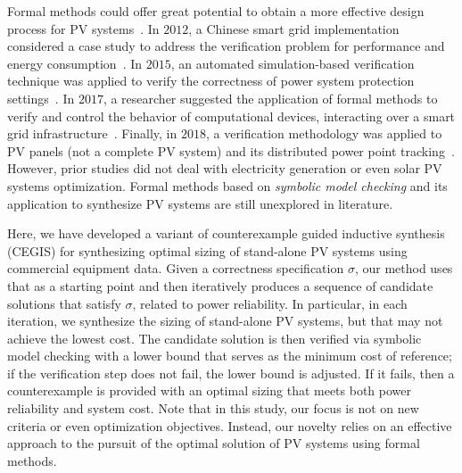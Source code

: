 \documentclass[journal]{IEEEtran}
\begin{document}
Formal methods could offer great potential to obtain a more effective design process for PV systems~\cite{ClarkeHV18}. In $2012$, a Chinese smart grid implementation considered a case study to address the verification problem for performance and energy consumption~\cite{Yukseletall2012}. In $2015$, an automated simulation-based verification technique was applied to verify the correctness of power system protection settings~\cite{Sengupta2015}. In $2017$, a researcher suggested the application of formal methods to verify and control the behavior of computational devices, interacting over a smart grid infrastructure~\cite{Abate2017}. Finally, in $2018$, a verification methodology was applied to PV panels (not a complete PV system) and its distributed power point tracking~\cite{Driouich2018}. However, prior studies did not deal with electricity generation or even solar PV systems optimization. Formal methods based on \textit{symbolic model checking} and its application to synthesize PV systems are still unexplored in literature.
 
Here, we have developed a variant of counterexample guided inductive synthesis (CEGIS) for synthesizing optimal sizing of stand-alone PV systems using commercial equipment data. Given a correctness specification $\sigma$, our method uses that as a starting point and then iteratively produces a sequence of candidate solutions that satisfy $\sigma$, related to power reliability. In particular, in each iteration, we synthesize the sizing of stand-alone PV systems, but that may not achieve the lowest cost. The candidate solution is then verified via symbolic model checking with a lower bound that serves as the minimum cost of reference; if the verification step does not fail, the lower bound is adjusted. If it fails, then a counterexample is provided with an optimal sizing that meets both power reliability and system cost. Note that in this study, our focus is not on new criteria or even optimization objectives. Instead, our novelty relies on an effective approach to the pursuit of the optimal solution of PV systems using formal methods. 
\end{document}
